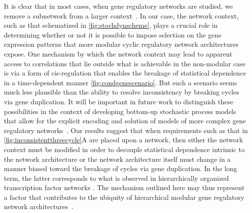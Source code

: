 It is clear that in most cases, when gene regulatory networks are studied, we remove a subnetwork from a larger context~\cite{Alon2007}. In our case, the network context, such as that schematized in \ref{fig:stochdynscheme}, plays a crucial role in determining whether or not it is possible to impose selection on the gene expression patterns that more modular cyclic regulatory network architectures expose. One mechanism by which the network context may lead to apparent access to correlations that lie outside what is achievable in the non-modular case is via a form of cis-regulation that enables the breakage of statistical dependence in a time-dependent manner \ref{fig:condgenescenario}. But such a scenario seems much less plausible than the ability to resolve inconsistency by breaking cycles via gene duplication. It will be important in future work to distinguish these possibilities in the context of developing bottom-up stochastic process models that allow for the explicit encoding and solution of models of more complex gene regulatory networks~\cite{Walczak2009,Mugler2009}. Our results suggest that when requirements such as that in \ref{fig:inconsistentthreecycle}A are placed upon a network, then either the network context must be modified in order to decouple statistical dependence intrinsic to the network architecture or the network architecture itself must change in a manner biased toward the breakage of cycles via gene duplication. In the long term, the latter corresponds to what is observed in hierarchically organized transcription factor networks \cite{Jothi2009,Bhardwaj2010,Chalancon2012,Colm}. The mechanism outlined here may thus represent a factor that contributes to the ubiquity of hierarchical modular gene regulatory network architectures~\cite{Ravasz2002,Segre2005,Wagner2007,Erwin2009,Jothi2009,Bhardwaj2010,Colm}.

